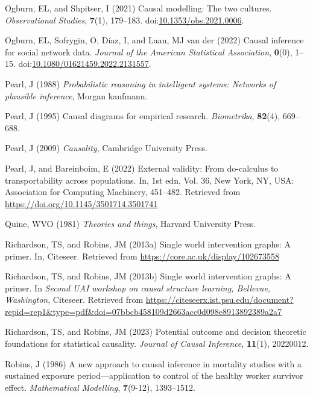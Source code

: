 \documentclass[
  single column]{article}
\newlength{\cslhangindent}
\newenvironment{CSLReferences}[2] %
 {\begin{list}{}{%
  \setlength{\itemindent}{0pt}
  \setlength{\leftmargin}{0pt}
  \setlength{\parsep}{0pt}
  \ifodd #1
   \setlength{\leftmargin}{\cslhangindent}
   \setlength{\itemindent}{-1\cslhangindent}
  \fi
  \setlength{\itemsep}{#2\baselineskip}}}
 {\end{list}}
\begin{document}
\begin{CSLReferences}{1}{0}
Ogburn, EL, and Shpitser, I (2021) Causal modelling: The two cultures.
\emph{Observational Studies}, \textbf{7}(1), 179--183.
doi:\href{https://doi.org/10.1353/obs.2021.0006}{10.1353/obs.2021.0006}.

Ogburn, EL, Sofrygin, O, Díaz, I, and Laan, MJ van der (2022) Causal
inference for social network data. \emph{Journal of the American
Statistical Association}, \textbf{0}(0), 1--15.
doi:\href{https://doi.org/10.1080/01621459.2022.2131557}{10.1080/01621459.2022.2131557}.

Pearl, J (1988) \emph{Probabilistic reasoning in intelligent systems:
Networks of plausible inference}, Morgan kaufmann.

Pearl, J (1995) Causal diagrams for empirical research.
\emph{Biometrika}, \textbf{82}(4), 669--688.

Pearl, J (2009) \emph{Causality}, Cambridge University Press.

Pearl, J, and Bareinboim, E (2022) External validity: From do-calculus
to transportability across populations. In, 1st edn, Vol. 36, New York,
NY, USA: Association for Computing Machinery, 451--482. Retrieved from
\url{https://doi.org/10.1145/3501714.3501741}

Quine, WVO (1981) \emph{Theories and things}, Harvard University Press.

Richardson, TS, and Robins, JM (2013a) Single world intervention graphs:
A primer. In, Citeseer. Retrieved from
\url{https://core.ac.uk/display/102673558}

Richardson, TS, and Robins, JM (2013b) Single world intervention graphs:
A primer. In \emph{Second UAI workshop on causal structure learning,
{B}ellevue, {W}ashington}, Citeseer. Retrieved from
\url{https://citeseerx.ist.psu.edu/document?repid=rep1&type=pdf&doi=07bbcb458109d2663acc0d098e8913892389a2a7}

Richardson, TS, and Robins, JM (2023) Potential outcome and decision
theoretic foundations for statistical causality. \emph{Journal of Causal
Inference}, \textbf{11}(1), 20220012.

Robins, J (1986) A new approach to causal inference in mortality studies
with a sustained exposure period---application to control of the healthy
worker survivor effect. \emph{Mathematical Modelling}, \textbf{7}(9-12),
1393--1512.


\end{CSLReferences}
\end{document}
